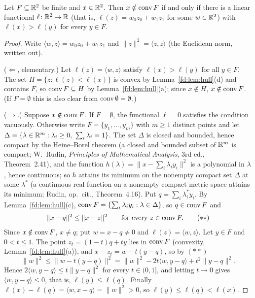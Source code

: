 \begin{lemma}\label{fd:lem:separation}
Let $F\subseteq\mathbb R^2$ be finite and $x\in\mathbb R^2$. Then $x\notin\operatorname{conv} F$ if and only if there is a linear
functional $\ell\colon\mathbb R^2\to\mathbb R$ (that is, $\ell(z)=w_0z_0+w_1z_1$ for some $w\in\mathbb R^2$) with
$\ell(x)>\ell(y)$ for every $y\in F$.
\end{lemma}

\begin{proof}
Write $\langle w,z\rangle=w_0z_0+w_1z_1$ and $\lVert z\rVert^2=\langle z,z\rangle$ (the Euclidean norm,
written out).

($\Leftarrow$, elementary.) Let $\ell(z)=\langle w,z\rangle$ satisfy $\ell(x)>\ell(y)$ for all $y\in F$.
The set $H=\{z:\ell(z)<\ell(x)\}$ is convex by Lemma~\ref{fd:lem:hull}(d) and contains $F$, so
$\operatorname{conv} F\subseteq H$ by Lemma~\ref{fd:lem:hull}(a); since $x\notin H$, $x\notin\operatorname{conv} F$. (If $F=\emptyset$
this is also clear from $\operatorname{conv}\emptyset=\emptyset$.)

($\Rightarrow$.) Suppose $x\notin\operatorname{conv} F$. If $F=\emptyset$, the functional $\ell=0$ satisfies the
condition vacuously. Otherwise write $F=\{y_1,\dots,y_m\}$ with $m\ge1$ distinct points and let
$\Delta=\{\lambda\in\R^m:\lambda_i\ge0,\ \sum_i\lambda_i=1\}$. The set $\Delta$ is closed and bounded, hence
compact by the Heine--Borel theorem (a closed and bounded subset of $\mathbb R^m$ is compact; W.~Rudin,
\emph{Principles of Mathematical Analysis}, 3rd ed., Theorem~2.41), and the function
$h(\lambda)=\lVert x-\sum_i\lambda_iy_i\rVert^2$ is a polynomial in $\lambda$, hence continuous; so $h$
attains its minimum on the nonempty compact set $\Delta$ at some $\lambda^*$ (a continuous real function on
a nonempty compact metric space attains its minimum; Rudin, op.\ cit., Theorem~4.16). Put
$q=\sum_i\lambda^*_iy_i$. By Lemma~\ref{fd:lem:hull}(c), $\operatorname{conv} F=\{\sum_i\lambda_iy_i:\lambda\in\Delta\}$,
so $q\in\operatorname{conv} F$ and
\begin{equation*}
  \lVert x-q\rVert^2\le\lVert x-z\rVert^2\qquad\text{for every }z\in\operatorname{conv} F. \tag{$**$}
\end{equation*}
Since $x\notin\operatorname{conv} F$, $x\ne q$; put $w=x-q\ne0$ and $\ell(z)=\langle w,z\rangle$. Let $y\in F$ and
$0<t\le1$. The point $z_t=(1-t)q+ty$ lies in $\operatorname{conv} F$ (convexity, Lemma~\ref{fd:lem:hull}(a)), and
$x-z_t=w-t(y-q)$, so by $(**)$
\[
  \lVert w\rVert^2\le\lVert w-t(y-q)\rVert^2=\lVert w\rVert^2-2t\langle w,y-q\rangle+t^2\lVert y-q\rVert^2 .
\]
Hence $2\langle w,y-q\rangle\le t\lVert y-q\rVert^2$ for every $t\in(0,1]$, and letting $t\to0$ gives
$\langle w,y-q\rangle\le0$, that is, $\ell(y)\le\ell(q)$. Finally
$\ell(x)-\ell(q)=\langle w,x-q\rangle=\lVert w\rVert^2>0$, so $\ell(y)\le\ell(q)<\ell(x)$.
\end{proof}

